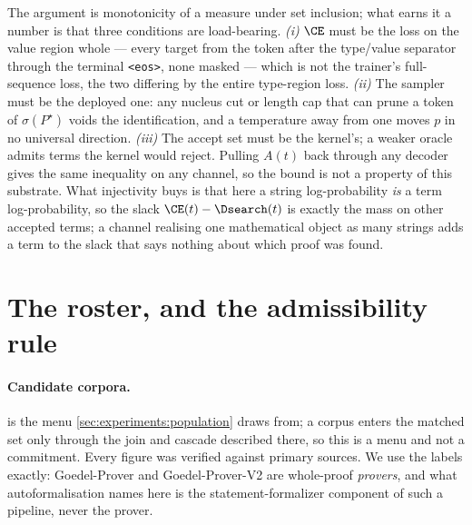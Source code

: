 The argument is monotonicity of a measure under set inclusion;
what earns it a number is that three conditions are load-bearing.
\emph{(i)} \(\CE\) must be the loss on the value region whole --- every target
from the token after the type/value separator through the terminal
\texttt{<eos>}, none masked --- which is not the trainer's full-sequence loss,
the two differing by the entire type-region loss.
\emph{(ii)} The sampler must be the deployed one:
any nucleus cut or length cap that can prune a token of \(\sigma(P^\star)\)
voids the identification, and a temperature away from one moves \(p\) in no
universal direction.
\emph{(iii)} The accept set must be the kernel's;
a weaker oracle admits terms the kernel would reject.
Pulling \(A(t)\) back through any decoder gives the same inequality on any
channel, so the bound is not a property of this substrate.
What injectivity buys is that here a string log-probability \emph{is} a term
log-probability, so the slack \(\CE(t) - \Dsearch(t)\) is exactly the mass on
other accepted terms;
a channel realising one mathematical object as many strings adds a term to the
slack that says nothing about which proof was found.

\section{The roster, and the admissibility rule}
\label{app:admissibility}

\paragraph{Candidate corpora.}
 is the menu \cref{sec:experiments:population} draws from;
a corpus enters the matched set only through the join and cascade described
there, so this is a menu and not a commitment.
Every figure was verified against primary sources.
We use the labels exactly:
Goedel-Prover and Goedel-Prover-V2 \citep{lin2025goedelprover,
lin2025goedelproverv2} are whole-proof \emph{provers}, and what
autoformalisation names here is the statement-formalizer component of such a
pipeline, never the prover.

